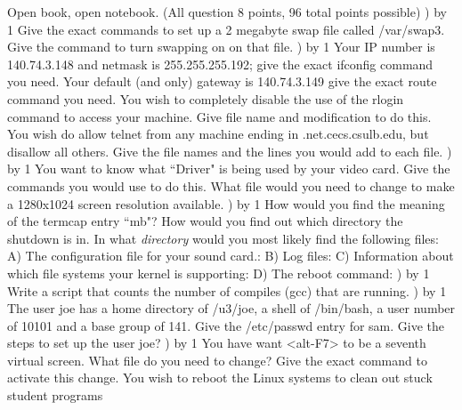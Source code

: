 
\parindent=0in
\nopagenumbers
\newcount\quesno
{}
\def\ques{\number\quesno) \advance\quesno by 1}
\def\aspace{\vskip 1.5in}

Open book, open notebook. (All question 8 points, 96 total points possible)
\hfill\break
\ques
Give the exact commands to set up a 2 megabyte swap file
called {\ltt{}/var/swap3}.
\vskip 0.8in
Give the command to turn swapping on on that file.
\vskip 0.4in
\ques
Your IP number is {\ltt{}140.74.3.148} and netmask is {\ltt{}255.255.255.192};
give the exact {\ltt{}ifconfig} command you need.
\vskip 0.4in
Your default (and only) gateway is {\ltt{}140.74.3.149}
give the exact {\ltt{}route} command you need.
\vskip 0.4in
You wish to completely disable the use of the {\ltt{}rlogin} command to
access your machine.
Give file name and modification to do this.
\vskip 0.8in
You wish do allow {\ltt{}telnet} from any machine ending in
{\ltt{}.net.cecs.csulb.edu}, but disallow all others.
Give the file names and the lines you would add to each file.
\vskip 1.6in
\ques
You want to know what ``Driver" is being used by your video card.
Give the commands you would use to do this.
\vskip 1.0in
What file would you need to change to make a {\ltt{}1280x1024} screen resolution
available.
\vskip 0.4in
\vfill\eject
\ques
How would you find the meaning of the termcap entry ``mb"?
\vskip 0.4in
How would you find out which directory the {\ltt{}shutdown} is in.
\vskip 0.4in
In what {\it directory} would you most likely find
the following files:
\hfill\break
A) The configuration file for your sound card.:
\vskip 0.3in
B) Log files:
\vskip 0.3in
C) Information about which file systems your kernel is supporting:
\vskip 0.3in
D) The {\ltt{}reboot} command:
\vskip 0.3in
\ques
Write a script that counts the number of compiles ({\ltt{}gcc}) that
are running.
\vskip 2.0in
\ques
The user {\ltt{}joe} has  a home directory of {\ltt{}/u3/joe},
a shell of {\ltt{}/bin/bash}, a user number of {\ltt{}10101}
and a base group of {\ltt{}141}.
Give the {\ltt{}/etc/passwd} entry for {\ltt{}sam}.
\vskip 0.4in
Give the steps to set up the user {\ltt{}joe}?
\vskip 1.2in
\vfill\eject
\ques
You have want {\ltt{}<alt-F7>} to be a seventh virtual screen.
What file do you need to change? Give the exact command to activate this change.
\vskip 0.8in
You wish to reboot the Linux systems to clean out stuck student programs
